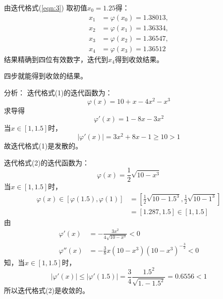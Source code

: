 \begin{example}
\begin{solution}
        由迭代格式(\ref{eqn:3})
        取初值$x_0 = 1.25$得：
        \begin{align}
            x_1 &= \varphi(x_0) = 1.38013,\\
            x_2 &= \varphi(x_1) = 1.36334,\\
            x_3 &= \varphi(x_2) = 1.36547,\\
            x_4 &= \varphi(x_3) = 1.36512
        \end{align}
        结果精确到四位有效数字，迭代到$x_4$得到收敛结果。
        \begin{notice}
            四步就能得到收敛的结果。
        \end{notice}
    \end{solution}
\end{example}

\begin{extend}
    分析：
    迭代格式(1)的迭代函数为：
    \begin{equation*}
        \varphi(x) = 10+x-4x^2-x^3
    \end{equation*}
    求导得
    \begin{equation*}
        \varphi'(x) = 1-8x-3x^2 
    \end{equation*}
    当$x \in [1,1.5]$时，
    \begin{equation*}
        |\varphi'(x)| = 3x^2+8x-1 \geq 10 > 1
    \end{equation*}
    故迭代格式(1)是发散的。

    迭代格式(2)的迭代函数为：
    \begin{equation*}
        \varphi(x) = \frac{1}{2}\sqrt{10-x^3}
    \end{equation*}
    当$x \in [1,1.5]$时，
    \begin{align*}
        \varphi(x) \in [\varphi(1.5),\varphi(1)] & = [\frac{1}{2}\sqrt{10-{1.5}^3},\frac{1}{2}\sqrt{10-1^3}]\\
        & = [1.287,1.5] \in [1,1.5]
    \end{align*}
    由
        \begin{align*}
            \varphi'(x) &= -\frac{3x^2}{4\sqrt{10-x^3}} < 0\\
            \varphi''(x) &= -\frac{3}{8}x(10-x^3)(10-x^3)^{-\frac{3}{2}} < 0
        \end{align*}
    知，当$x \in [1,1.5]$时，
    \begin{equation*}
        |\varphi'(x)| \leq |\varphi'(1.5)| = \frac{3}{4} \frac{{1.5}^2}{\sqrt{1.-{1.5}^2}} = 0.6556 < 1
    \end{equation*}
    所以迭代格式(2)是收敛的。


\end{extend}

